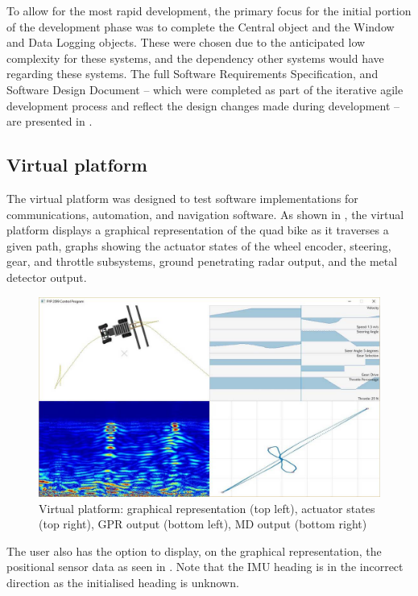 \documentclass[main.tex]{subfiles}
\begin{document}
To allow for the most rapid development, the primary focus for the initial portion of the development phase was to complete the Central object and the Window and Data Logging objects. These were chosen due to the anticipated low complexity for these systems, and the dependency other systems would have regarding these systems. The full Software Requirements Specification, and Software Design Document – which were completed as part of the iterative agile development process and reflect the design changes made during development – are presented in .


\subsection{Virtual platform}
The virtual platform was designed to test software implementations for communications, automation, and navigation software. As shown in , the virtual platform displays a graphical representation of the quad bike as it traverses a given path, graphs showing the actuator states of the wheel encoder, steering, gear, and throttle subsystems, ground penetrating radar output, and the metal detector output.
\begin{figure}[ht]
\includegraphics[width=\textwidth]{4-DetailedDesign/virtualPlatform.jpg}
\centering
\caption[Virtual platform display window]{Virtual platform: graphical representation (top left), actuator states (top right), GPR output (bottom left), MD output (bottom right)} 
\end{figure}
The user also has the option to display, on the graphical representation, the positional sensor data as seen in . Note that the IMU heading is in the incorrect direction as the initialised heading is unknown.
\end{document}
